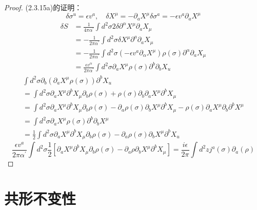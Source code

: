 \begin{proof}
(2.3.15a)的证明：
$$
\delta \sigma^{u}=\epsilon v^{a}, \quad \delta X^{\mu}=-\partial_{a} X^{\mu} \delta \sigma^{a}=-\epsilon v^{a} \partial_{a} X^{\mu}
$$
$$
\begin{aligned}
\delta S &=\frac{1}{4 \pi \alpha^{\prime}} \int d^{2} \sigma 2 \delta \partial^{\alpha} X^{\mu} \partial_{a} X_{\mu} \\
&=-\frac{1}{2 \pi \alpha^{\prime}} \int d^{2} \sigma \delta X^{\mu} \partial^{a} \partial_{a} X_{\mu} \\
&=-\frac{1}{2 \pi \alpha^{\prime}} \int d^{2} \sigma\left(-\epsilon v^{a} \partial_{\alpha} X^{\mu}\right) \rho(\sigma) \partial^{\alpha} \partial_{a} X_{\mu} \\
&=\frac{\epsilon v^{\alpha}}{2 \pi \alpha^{\prime}} \int d^{2} \sigma  \partial_{a} X^{\mu} \rho(\sigma) \partial^{b} \partial_{b} X_{u}
\end{aligned}
$$
$$
\begin{array}{l}
\int d^{2} \sigma \partial_{b}\left(\partial_{a} X^{\mu} \rho(\sigma)\right) \partial^{b} X_{u} \\
=\int d^{2} \sigma  \partial_{a} X^{\mu} \partial^{b} X_{\mu} \partial_{b} \rho(\sigma)+\rho(\sigma) \partial_{b} \partial_{a} X^{\mu} \partial^{b} X_{\mu}\\
=\int d^{2} \sigma \partial_{a} X^{\mu} \partial^{b} X_{\mu} \partial_{b} \rho(\sigma)-\partial_{a} \rho(\sigma) \partial_{b} X^{\mu} \partial^{b} X_{\mu}-\rho(\sigma) \partial_{a} X^{\mu} \partial_{b} \partial^{b} X^{\mu} \\
=\int d^{2} \sigma \partial_{a} X^{\mu} \rho(\sigma) \partial^{b} \partial_{b} X^{\mu} \\
=\frac{1}{2} \int d^{2} \sigma \partial_{a} X^{\mu} \partial^{b} X_{\mu} \partial_{b} \rho(\sigma)-\partial_{a} \rho(\sigma) \partial_{b} X^{\mu} \partial^{b} X_{u}
\end{array}
$$
$$
\frac{\epsilon v^{a}}{2 \pi \alpha^{\prime}} \int d^{2} \sigma \frac{1}{2} \left[\partial_{a} X^{\mu} \partial^{b} X_{\mu} \partial_{b} \rho(\sigma)-\partial_{a}\rho \partial_{b} X^{\mu}  \partial^{b} X_{\mu}\right]=\frac{i \epsilon}{2 \pi} \int d^{2} z j^{a}(\sigma) \partial_{a}(\rho)
$$
\end{proof}


\section{共形不变性}%

